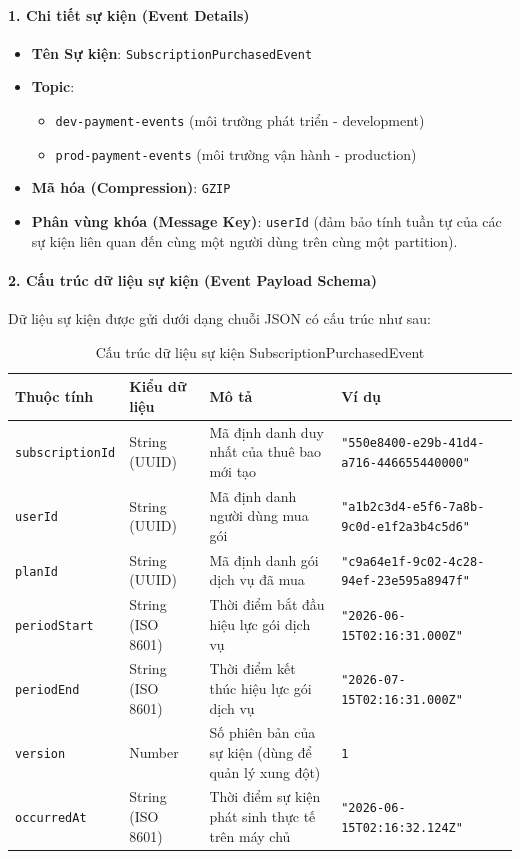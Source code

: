 \paragraph{1. Chi tiết sự kiện (Event Details)}
\begin{itemize}
\item \textbf{Tên Sự kiện}: \texttt{SubscriptionPurchasedEvent}
\item \textbf{Topic}:
\begin{itemize}
\item \texttt{dev-payment-events} (môi trường phát triển - development)
\item \texttt{prod-payment-events} (môi trường vận hành - production)
\end{itemize}
\item \textbf{Mã hóa (Compression)}: \texttt{GZIP}
\item \textbf{Phân vùng khóa (Message Key)}: \texttt{userId} (đảm bảo tính tuần tự của các sự kiện liên quan đến cùng một người dùng trên cùng một partition).
\end{itemize}

\paragraph{2. Cấu trúc dữ liệu sự kiện (Event Payload Schema)}
Dữ liệu sự kiện được gửi dưới dạng chuỗi JSON có cấu trúc như sau:

\begin{table}[H]
\centering
\begin{tabular}{|l|l|l|l|}
\hline
\textbf{Thuộc tính} & \textbf{Kiểu dữ liệu} & \textbf{Mô tả} & \textbf{Ví dụ} \\ \hline
\texttt{subscriptionId} & String (UUID) & Mã định danh duy nhất của thuê bao mới tạo & \texttt{"550e8400-e29b-41d4-a716-446655440000"} \\ \hline
\texttt{userId} & String (UUID) & Mã định danh người dùng mua gói & \texttt{"a1b2c3d4-e5f6-7a8b-9c0d-e1f2a3b4c5d6"} \\ \hline
\texttt{planId} & String (UUID) & Mã định danh gói dịch vụ đã mua & \texttt{"c9a64e1f-9c02-4c28-94ef-23e595a8947f"} \\ \hline
\texttt{periodStart} & String (ISO 8601) & Thời điểm bắt đầu hiệu lực gói dịch vụ & \texttt{"2026-06-15T02:16:31.000Z"} \\ \hline
\texttt{periodEnd} & String (ISO 8601) & Thời điểm kết thúc hiệu lực gói dịch vụ & \texttt{"2026-07-15T02:16:31.000Z"} \\ \hline
\texttt{version} & Number & Số phiên bản của sự kiện (dùng để quản lý xung đột) & \texttt{1} \\ \hline
\texttt{occurredAt} & String (ISO 8601) & Thời điểm sự kiện phát sinh thực tế trên máy chủ & \texttt{"2026-06-15T02:16:32.124Z"} \\ \hline
\end{tabular}
\caption{Cấu trúc dữ liệu sự kiện SubscriptionPurchasedEvent}
\label{tab:event-payload-schema}
\end{table}

